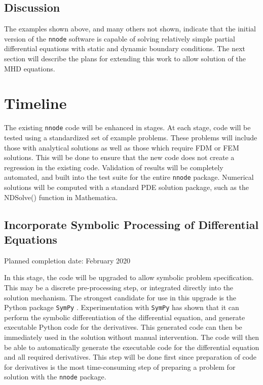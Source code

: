 \documentclass{article}
\begin{document}
\subsection{Discussion}

The examples shown above, and many others not shown, indicate that the initial version of the \texttt{nnode} software is capable of solving relatively simple partial differential equations with static and dynamic boundary conditions. The next section will describe the plans for extending this work to allow solution of the MHD equations.


\newpage

\section{Timeline}

The existing \texttt{nnode} code will be enhanced in stages. At each stage, code will be tested using a standardized set of example problems. These problems will include those with analytical solutions as well as those which require FDM or FEM solutions. This will be done to ensure that the new code does not create a regression in the existing code. Validation of results will be completely automated, and built into the test suite for the entire \texttt{nnode} package. Numerical solutions will be computed with a standard PDE solution package, such as the NDSolve() function in Mathematica.

\subsection{Incorporate Symbolic Processing of Differential Equations}

Planned completion date: February 2020

In this stage, the code will be upgraded to allow symbolic problem specification. This may be a discrete pre-processing step, or integrated directly into the solution mechanism. The strongest candidate for use in this upgrade is the Python package \texttt{SymPy} \cite{sympy}. Experimentation with \texttt{SymPy} has shown that it can perform the symbolic differentiation of the differential equation, and generate executable Python code for the derivatives. This generated code can then be immediately used in the solution without manual intervention. The code will then be able to automatically generate the executable code for the differential equation and all required derivatives. This step will be done first since preparation of code for derivatives is the most time-consuming step of preparing a problem for solution with the \texttt{nnode} package.
\end{document}
